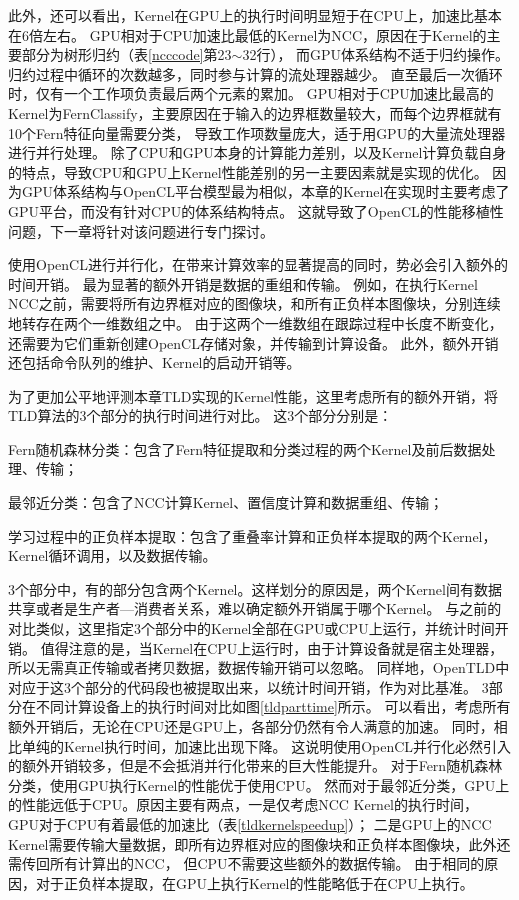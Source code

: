 此外，还可以看出，Kernel在GPU上的执行时间明显短于在CPU上，加速比基本在6倍左右。
GPU相对于CPU加速比最低的Kernel为NCC，原因在于Kernel的主要部分为树形归约（表\ref{ncccode}第23$\sim$32行），
而GPU体系结构不适于归约操作。归约过程中循环的次数越多，同时参与计算的流处理器越少。
直至最后一次循环时，仅有一个工作项负责最后两个元素的累加。
GPU相对于CPU加速比最高的Kernel为FernClassify，主要原因在于输入的边界框数量较大，而每个边界框就有10个Fern特征向量需要分类，
导致工作项数量庞大，适于用GPU的大量流处理器进行并行处理。
除了CPU和GPU本身的计算能力差别，以及Kernel计算负载自身的特点，导致CPU和GPU上Kernel性能差别的另一主要因素就是实现的优化。
因为GPU体系结构与OpenCL平台模型最为相似，本章的Kernel在实现时主要考虑了GPU平台，而没有针对CPU的体系结构特点。
这就导致了OpenCL的性能移植性问题，下一章将针对该问题进行专门探讨。

使用OpenCL进行并行化，在带来计算效率的显著提高的同时，势必会引入额外的时间开销。
最为显著的额外开销是数据的重组和传输。
例如，在执行Kernel NCC之前，需要将所有边界框对应的图像块，和所有正负样本图像块，分别连续地转存在两个一维数组之中。
由于这两个一维数组在跟踪过程中长度不断变化，还需要为它们重新创建OpenCL存储对象，并传输到计算设备。
此外，额外开销还包括命令队列的维护、Kernel的启动开销等。

为了更加公平地评测本章TLD实现的Kernel性能，这里考虑所有的额外开销，将TLD算法的3个部分的执行时间进行对比。
这3个部分分别是：
\begin{compactitem}
\item Fern随机森林分类：包含了Fern特征提取和分类过程的两个Kernel及前后数据处理、传输；
\item 最邻近分类：包含了NCC计算Kernel、置信度计算和数据重组、传输；
\item 学习过程中的正负样本提取：包含了重叠率计算和正负样本提取的两个Kernel，Kernel循环调用，以及数据传输。
\end{compactitem}
3个部分中，有的部分包含两个Kernel。这样划分的原因是，两个Kernel间有数据共享或者是生产者—消费者关系，难以确定额外开销属于哪个Kernel。
与之前的对比类似，这里指定3个部分中的Kernel全部在GPU或CPU上运行，并统计时间开销。
值得注意的是，当Kernel在CPU上运行时，由于计算设备就是宿主处理器，所以无需真正传输或者拷贝数据，数据传输开销可以忽略。
同样地，OpenTLD中对应于这3个部分的代码段也被提取出来，以统计时间开销，作为对比基准。
3部分在不同计算设备上的执行时间对比如图\ref{tldparttime}所示。
可以看出，考虑所有额外开销后，无论在CPU还是GPU上，各部分仍然有令人满意的加速。
同时，相比单纯的Kernel执行时间，加速比出现下降。
这说明使用OpenCL并行化必然引入的额外开销较多，但是不会抵消并行化带来的巨大性能提升。
对于Fern随机森林分类，使用GPU执行Kernel的性能优于使用CPU。
然而对于最邻近分类，GPU上的性能远低于CPU。原因主要有两点，一是仅考虑NCC Kernel的执行时间，
GPU对于CPU有着最低的加速比（表\ref{tldkernelspeedup}）；
二是GPU上的NCC Kernel需要传输大量数据，即所有边界框对应的图像块和正负样本图像块，此外还需传回所有计算出的NCC，
但CPU不需要这些额外的数据传输。
由于相同的原因，对于正负样本提取，在GPU上执行Kernel的性能略低于在CPU上执行。

